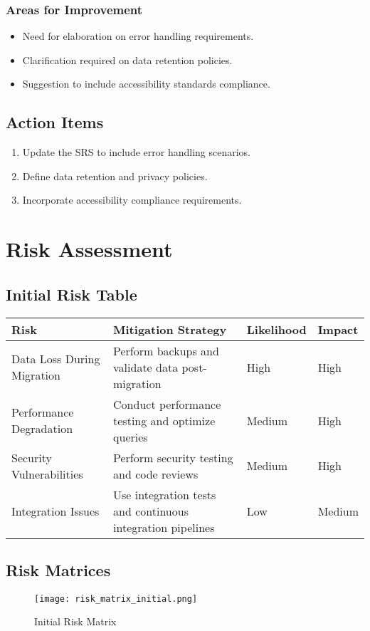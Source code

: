 \documentclass[12pt,a4paper]{report}
\begin{document}
\subsection{Areas for Improvement}
\begin{itemize}
    \item Need for elaboration on error handling requirements.
    \item Clarification required on data retention policies.
    \item Suggestion to include accessibility standards compliance.
\end{itemize}

\section{Action Items}
\begin{enumerate}
    \item Update the SRS to include error handling scenarios.
    \item Define data retention and privacy policies.
    \item Incorporate accessibility compliance requirements.
\end{enumerate}

\chapter{Risk Assessment}
\section{Initial Risk Table}
\begin{longtable}{p{4cm} p{6cm} p{2cm} p{2cm}}
\toprule
\textbf{Risk} & \textbf{Mitigation Strategy} & \textbf{Likelihood} & \textbf{Impact} \\
\midrule
Data Loss During Migration & Perform backups and validate data post-migration & High & High \\
Performance Degradation & Conduct performance testing and optimize queries & Medium & High \\
Security Vulnerabilities & Perform security testing and code reviews & Medium & High \\
Integration Issues & Use integration tests and continuous integration pipelines & Low & Medium \\
\bottomrule
\end{longtable}

\section{Risk Matrices}
\begin{figure}[H]
\centering
\texttt{[image: risk\_matrix\_initial.png]}
\caption{Initial Risk Matrix}
\end{figure}
\end{document}
